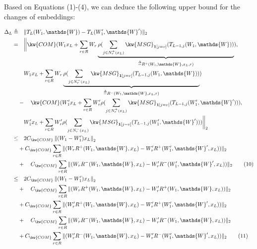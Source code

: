 Based on Equations (1)-(4), 
we can deduce the following upper bound
for the changes of embeddings:
\begin{small}
\begin{align*}
\Delta_{L}  \triangleq & \quad\|T_{L}(W_{1},\mathds{W})-T_{L}(W_{1}^{\prime},\mathds{W}^{\prime})\|_{2} \\
  =&\quad\bigg\|\kw{COM}(W_{1}x_{L} + \sum_{r\in R} W_r\underbrace{\rho(\sum_{j\in  N^+_r(x_{L})}\kw{MSG}_{{\bf 1}[j=v]}(T_{L-1,j}(W_{1},\mathds{W}))}_{\overset{\Delta}
 {\operatorname*{\operatorname*{=}}}R^+(W_{1},\mathds{W},x_{L},r)}),\\
 &\quad  W_{1}x_{L}+\sum_{r\in R} W_r\underbrace{\rho(\sum_{j\in 
 		N^-_r(x_{L})}\kw{MSG}_{{\bf 1}[j=v]}(T_{L-1,j}(W_{1},\mathds{W}))}_{\overset{\Delta}
 	{\operatorname*{\operatorname*{=}}}R^-(W_{1},\mathds{W},x_{L},r)})\\
 & -\quad\kw{COM}(W'_{1}x_{L}+\sum_{r\in R} W'_r\rho(\sum_{j\in 
 		N^+_r(x_{L})}\kw{MSG}_{{\bf 1}[j=v]}(T_{L-1,j}(W'_{1},\mathds{W}'))), \\
 		&\quad  W'_{1}x_{L}+\sum_{r\in R} W'_r\rho(\sum_{j\in 
 		N^-_r(x_{L})}\kw{MSG}_{{\bf 1}[j=v]}(T_{L-1,j}(W'_{1},\mathds{W}')))\bigg\|_{2} \\
  \leq& \quad 2C_{\kw{COM}}\left\|(W_{1}-W_{1}^{\prime})x_{L}\right\|_{2} \\
 & + C_{\kw{COM}}\sum_{r\in R}\|(W_rR^+(W_{1},\mathds{W},x_{L})-W_r^{\prime}R^+(W_{1}^{\prime},\mathds{W}^{\prime},x_{L}))\|_{2}\\
 & +\quad C_{\kw{COM}}\sum_{r\in R}\|(W_rR^-(W_{1},\mathds{W},x_{L})-W_r^{\prime}R^-(W_{1}^{\prime},\mathds{W}^{\prime},x_{L}))\|_{2}  \tag{10}\\
  \leq& \quad 2C_{\kw{COM}}\left\|(W_{1}-W_{1}^{\prime})x_{L}\right\|_{2} \\
& +\quad C_{\kw{COM}}\sum_{r\in R}\|(W_rR^+(W_{1},\mathds{W},x_{L})-W_r^{\prime}R^+(W_{1},\mathds{W},x_{L}))\|_{2}\\
& + C_{\kw{COM}}\sum_{r\in R}\|(W^{\prime}_rR^+(W_{1},\mathds{W},x_{L})-W_r^{\prime}R^+(W_{1}^{\prime},\mathds{W}^{\prime},x_{L}))\|_{2}\\
& +\quad C_{\kw{COM}}\sum_{r\in R}\|(W_rR^-(W_{1},\mathds{W},x_{L})-W_r^{\prime}R^-(W_{1},\mathds{W},x_{L}))\|_{2}\\
& + C_{\kw{COM}}\sum_{r\in R}\|(W^{\prime}_rR^-(W_{1},\mathds{W},x_{L})-W_r^{\prime}R^-(W_{1}^{\prime},\mathds{W}^{\prime},x_{L}))\|_{2} \tag{11}
\end{align*}
\end{small}

